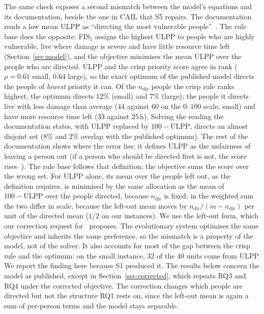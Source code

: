 \documentclass[systems,article,submit,moreauthors,pdftex]{Definitions/mdpi}
\begin{document}
The same check exposes a second mismatch between the model's equations and its
documentation, beside the one in CAIL that S5 repairs. The documentation reads a low mean ULPP
as ``directing the most vulnerable people''~\cite{rabiei2026resilient}. The rule base does the
opposite: FIS$_1$ assigns the highest ULPP to people who are highly vulnerable, live where
damage is severe and have little resource time left (Section~\ref{sec:model}), and the
objective minimises the mean ULPP over the people who are directed. ULPP and the crisp
priority score agree in rank ($\rho = 0.61$ small, $0.64$ large), so the exact optimum of the
published model directs the people of \emph{lowest} priority it can. Of the $n_{\mathrm{dir}}$
people the crisp rule ranks highest, the optimum directs $12\%$ (small) and $7\%$ (large); the
people it directs live with less damage than average ($44$ against $60$ on the $0$--$100$ scale,
small) and have more resource time left ($33$ against $25$\,h). Solving the reading the
documentation states, with ULPP replaced by $100 - \mathrm{ULPP}$, directs an almost disjoint
set ($8\%$ and $2\%$ overlap with the published optimum). The rest of the documentation shows
where the error lies: it defines ULPP as the unfairness of leaving a person out (if a person
who should be directed first is not, the score rises~\cite{rabiei2026resilient}). The rule base
follows that definition; the objective sums the score over the wrong set. For ULPP alone, its
mean over the people left out, as the definition requires, is minimised by the same allocation as
the mean of $100 - \mathrm{ULPP}$ over the people directed, because $n_{\mathrm{dir}}$ is fixed; in
the weighted sum the two differ in scale, because the left-out mean moves by
$n_{\mathrm{dir}}/(m - n_{\mathrm{dir}})$ per unit of the directed mean ($1/2$ on our instances).
We use the left-out form, which our correction request for~\cite{rabiei2026resilient} proposes. The evolutionary system optimises the
same objective and inherits the same preference, so the mismatch is a property of the model,
not of the solver. It also accounts for most of the gap between the crisp rule and the
optimum: on the small instance, $32$ of the $40$ units come from ULPP. We report the finding
here because S1 produced it. The results below concern the model as published, except in
Section~\ref{sec:corrected}, which repeats RQ3 and RQ4 under the corrected objective. The
correction changes which people are directed but not the structure RQ1 rests on, since the
left-out mean is again a sum of per-person terms and the model stays separable.
\end{document}
